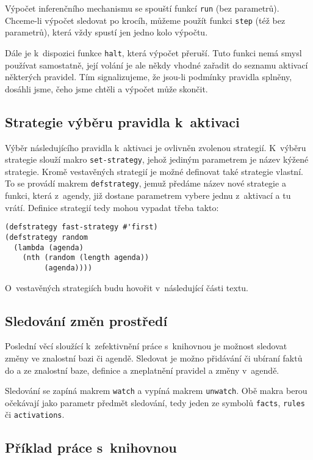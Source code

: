 Výpočet inferenčního mechanismu se spouští funkcí \verb|run| (bez parametrů).
Chceme-li výpočet sledovat po krocíh, můžeme použít funkci \verb|step| (též bez
parametrů), která vždy spustí jen jedno kolo výpočtu.

Dále je k~dispozici funkce \verb|halt|, která výpočet přeruší. Tuto funkci nemá
smysl používat samostatně, její volání je ale někdy vhodné zařadit do seznamu
aktivací některých pravidel. Tím signalizujeme, že jsou-li podmínky pravidla
splněny, dosáhli jsme, čeho jsme chtěli a výpočet může skončit.

\subsection{Strategie výběru pravidla k~aktivaci}
Výběr následujícího pravidla k~aktivaci je ovlivněn zvolenou strategií.
K~výběru strategie slouží makro \verb|set-strategy|, jehož jediným parametrem je
název kýžené strategie.
Kromě vestavěných strategií je možné definovat také strategie vlastní. To se
provádí makrem \verb|defstrategy|, jemuž předáme název nové strategie a
funkci, která z~agendy, již dostane parametrem vybere jednu z~aktivací a tu
vrátí. Definice strategií tedy mohou vypadat třeba takto:
\begin{verbatim}
(defstrategy fast-strategy #'first)
(defstrategy random
  (lambda (agenda)
    (nth (random (length agenda))
         (agenda))))
\end{verbatim}
O~vestavěných strategiích budu hovořit v~následující části textu.
\subsection{Sledování změn prostředí}
\label{watchers}
Poslední věcí sloužící k~zefektivnění práce s~knihovnou je možnost sledovat
změny ve znalostní bazi či agendě. Sledovat je možno přidávání či ubíraní faktů
do a ze znalostní baze, definice a zneplatnění pravidel a změny v~agendě.

Sledování se zapíná makrem \verb|watch| a vypíná makrem \verb|unwatch|. Obě
makra berou očekávají jako parametr předmět sledování, tedy jeden ze symbolů
\verb|facts|, \verb|rules| či \verb|activations|.
\subsection{Příklad práce s~knihovnou}

